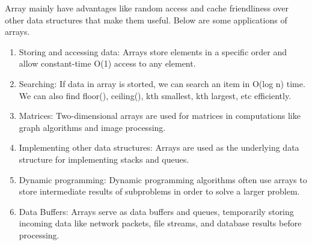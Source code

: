Array mainly have advantages like random access and cache friendliness
over other data structures that make them useful.
Below are some applications of arrays.
\begin{enumerate}
    \item Storing and accessing data: Arrays store elements in a
        specific order and allow constant-time O(1) access to any
        element.
    \item Searching: If data in array is storted, we can search an item
        in O(log n) time. We can also find floor(), ceiling(), kth
        smallest, kth largest, etc efficiently.
    \item Matrices: Two-dimensional arrays are used for matrices in
        computations like graph algorithms and image processing.
    \item Implementing other data structures: Arrays are used as the
        underlying data structure for implementing stacks and queues.
    \item Dynamic programming: Dynamic programming algorithms often use
        arrays to store intermediate results of subproblems in order to
        solve a larger problem.
    \item Data Buffers: Arrays serve as data buffers and queues,
        temporarily storing incoming data like network packets, file
        streams, and database results before processing.
\end{enumerate}
